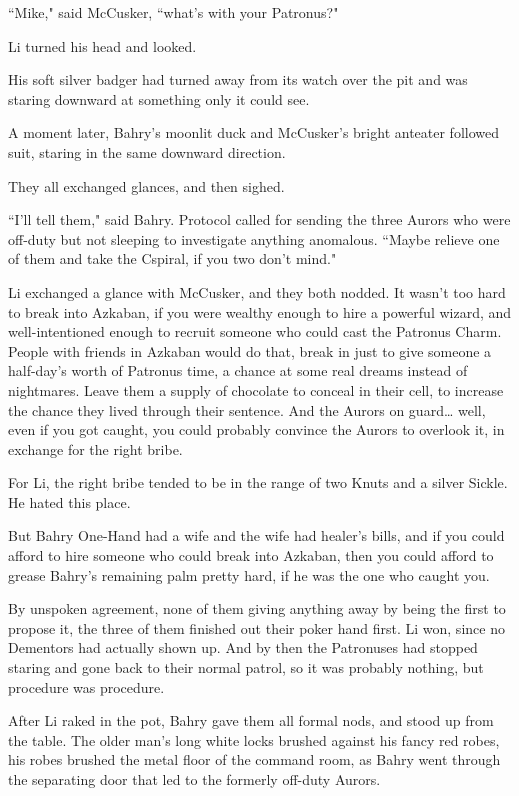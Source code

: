 ``Mike," said McCusker, ``what's with your Patronus?"

Li turned his head and looked.

His soft silver badger had turned away from its watch over the pit and was staring downward at something only it could see.

A moment later, Bahry's moonlit duck and McCusker's bright anteater followed suit, staring in the same downward direction.

They all exchanged glances, and then sighed.

``I'll tell them," said Bahry. Protocol called for sending the three Aurors who were off-duty but not sleeping to investigate anything anomalous. ``Maybe relieve one of them and take the C\?spiral, if you two don't mind."

Li exchanged a glance with McCusker, and they both nodded. It wasn't too hard to break into Azkaban, if you were wealthy enough to hire a powerful wizard, and well-intentioned enough to recruit someone who could cast the Patronus Charm. People with friends in Azkaban would do that, break in just to give someone a half-day's worth of Patronus time, a chance at some real dreams instead of nightmares. Leave them a supply of chocolate to conceal in their cell, to increase the chance they lived through their sentence. And the Aurors on guard{\ldots} well, even if you got caught, you could probably convince the Aurors to overlook it, in exchange for the right bribe.

For Li, the right bribe tended to be in the range of two Knuts and a silver Sickle. He hated this place.

But Bahry One-Hand had a wife and the wife had healer's bills, and if you could afford to hire someone who could break into Azkaban, then you could afford to grease Bahry's remaining palm pretty hard, if he was the one who caught you.

By unspoken agreement, none of them giving anything away by being the first to propose it, the three of them finished out their poker hand first. Li won, since no Dementors had actually shown up. And by then the Patronuses had stopped staring and gone back to their normal patrol, so it was probably nothing, but procedure was procedure.

After Li raked in the pot, Bahry gave them all formal nods, and stood up from the table. The older man's long white locks brushed against his fancy red robes, his robes brushed the metal floor of the command room, as Bahry went through the separating door that led to the formerly off-duty Aurors.

